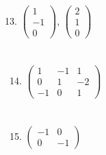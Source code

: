 \documentclass[fleqn]{article}
\begin{document}
13. \( \begin{pmatrix} 1 \\ -1 \\ 0 \end{pmatrix} \), \( \begin{pmatrix} 2 \\ 1 \\ 0 \end{pmatrix} \) \\\\\\\  
14. \( \begin{pmatrix} 1 & -1 & 1 \\ 0 & 1 & -2 \\ -1 & 0 & 1 \end{pmatrix} \) \\\\\\\  
15. \( \begin{pmatrix} -1 & 0 \\ 0 & -1 \end{pmatrix} \) \\\\\\\        
        
\end{document}
